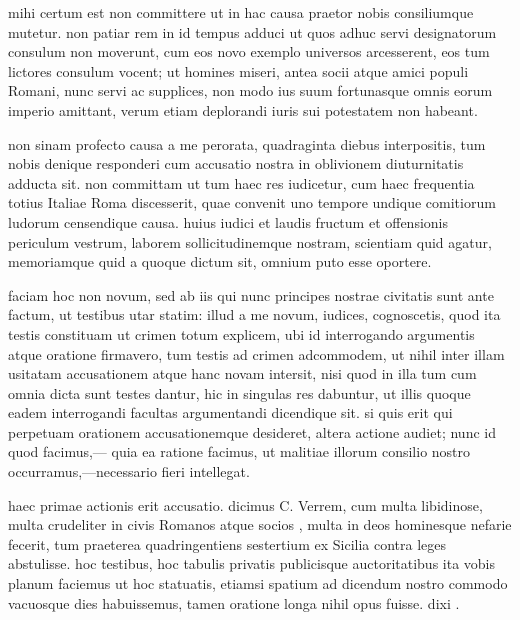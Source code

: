  mihi certum est non committere ut in hac causa praetor nobis consiliumque mutetur. non patiar rem in id tempus adduci ut quos adhuc servi designatorum consulum non moverunt, cum eos novo exemplo universos arcesserent, eos tum lictores consulum vocent; ut homines miseri, antea socii atque amici populi Romani, nunc servi ac supplices, non modo ius suum fortunasque omnis eorum imperio amittant, verum etiam deplorandi iuris sui potestatem non habeant.

 non sinam profecto causa a me perorata, quadraginta diebus interpositis, tum nobis denique responderi cum accusatio nostra in oblivionem diuturnitatis adducta sit. non committam ut tum haec res iudicetur, cum haec frequentia totius Italiae Roma discesserit, quae convenit uno tempore undique comitiorum ludorum censendique causa. huius iudici et laudis fructum et offensionis periculum vestrum, laborem sollicitudinemque nostram, scientiam quid agatur, memoriamque quid a quoque dictum sit, omnium puto esse oportere.

 faciam hoc non novum, sed ab iis qui nunc principes nostrae civitatis sunt ante factum, ut testibus utar statim: illud a me novum, iudices, cognoscetis, quod ita testis constituam ut crimen totum explicem, ubi id interrogando argumentis atque oratione firmavero, tum testis ad crimen adcommodem, ut nihil inter illam usitatam accusationem atque hanc novam intersit, nisi quod in illa tum cum omnia dicta sunt testes dantur, hic in singulas res dabuntur, ut illis quoque eadem interrogandi facultas argumentandi dicendique sit. si quis erit qui perpetuam orationem accusationemque desideret, altera actione audiet; nunc id quod facimus,— quia ea ratione facimus, ut malitiae illorum consilio nostro occurramus,—necessario fieri intellegat.

 haec primae actionis erit accusatio. dicimus C. Verrem, cum multa libidinose, multa crudeliter in civis Romanos atque socios , multa in deos hominesque nefarie fecerit, tum praeterea quadringentiens sestertium ex Sicilia contra leges abstulisse. hoc testibus, hoc tabulis privatis publicisque auctoritatibus ita vobis planum faciemus ut hoc statuatis, etiamsi spatium ad dicendum nostro commodo vacuosque dies habuissemus, tamen oratione longa nihil opus fuisse. dixi .

